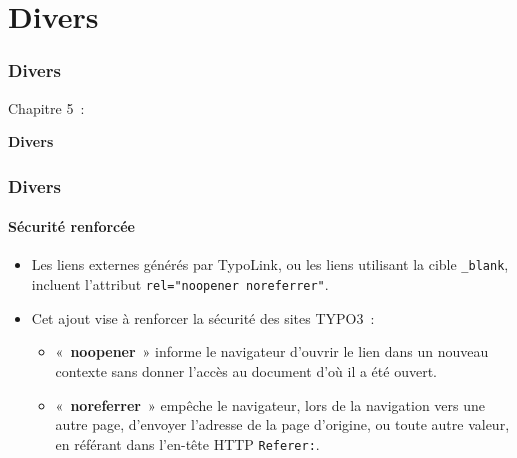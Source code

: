 %

\section{Divers}
\begin{frame}[fragile]
	\frametitle{Divers}

	\begin{center}\huge{Chapitre 5~:}\end{center}
	\begin{center}\huge{\color{typo3darkgrey}\textbf{Divers}}\end{center}

\end{frame}


\begin{frame}[fragile]
	\frametitle{Divers}
	\framesubtitle{Sécurité renforcée}

	\begin{itemize}
		\item Les liens externes générés par TypoLink, ou les liens utilisant la cible \texttt{\_blank},
			incluent l'attribut \texttt{rel="noopener noreferrer"}.
		\item Cet ajout vise à renforcer la sécurité des sites TYPO3~:

			\begin{itemize}
				\item «~\textbf{noopener}~» informe le navigateur d'ouvrir le lien dans un nouveau contexte sans
					donner l'accès au document d'où il a été ouvert.
				\item «~\textbf{noreferrer}~» empêche le navigateur, lors de la navigation vers une autre page,
					d'envoyer l'adresse de la page d'origine, ou toute autre valeur, en référant dans l'en-tête
					HTTP \texttt{Referer:}.
			\end{itemize}

	\end{itemize}

\end{frame}

